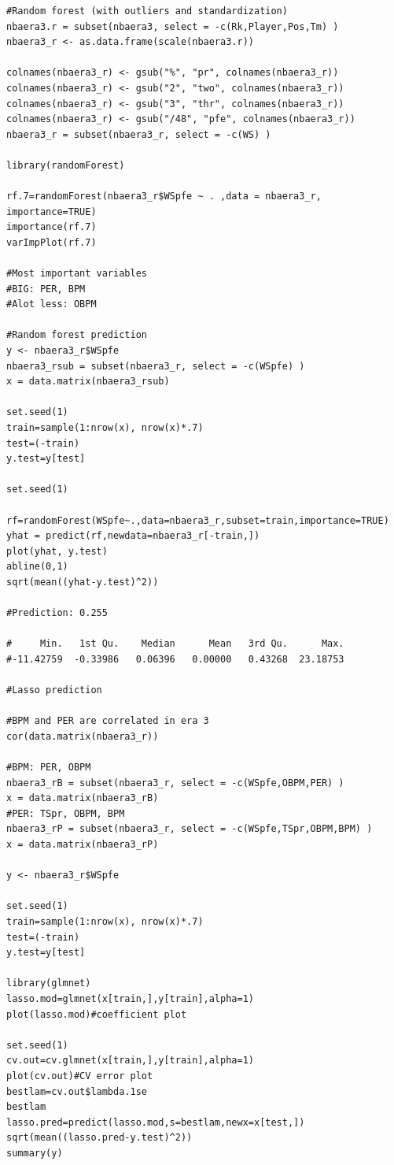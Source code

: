 \documentclass[11pt,letterpaper]{amsart}
\begin{document}
\begin{lstlisting}[breaklines]
#Random forest (with outliers and standardization)
nbaera3.r = subset(nbaera3, select = -c(Rk,Player,Pos,Tm) )
nbaera3_r <- as.data.frame(scale(nbaera3.r))

colnames(nbaera3_r) <- gsub("%", "pr", colnames(nbaera3_r))
colnames(nbaera3_r) <- gsub("2", "two", colnames(nbaera3_r))
colnames(nbaera3_r) <- gsub("3", "thr", colnames(nbaera3_r))
colnames(nbaera3_r) <- gsub("/48", "pfe", colnames(nbaera3_r))
nbaera3_r = subset(nbaera3_r, select = -c(WS) )

library(randomForest)

rf.7=randomForest(nbaera3_r$WSpfe ~ . ,data = nbaera3_r, importance=TRUE)
importance(rf.7)
varImpPlot(rf.7)

#Most important variables 
#BIG: PER, BPM 
#Alot less: OBPM

#Random forest prediction
y <- nbaera3_r$WSpfe
nbaera3_rsub = subset(nbaera3_r, select = -c(WSpfe) )
x = data.matrix(nbaera3_rsub)

set.seed(1)
train=sample(1:nrow(x), nrow(x)*.7)
test=(-train)
y.test=y[test]

set.seed(1)

rf=randomForest(WSpfe~.,data=nbaera3_r,subset=train,importance=TRUE)
yhat = predict(rf,newdata=nbaera3_r[-train,])
plot(yhat, y.test)
abline(0,1)
sqrt(mean((yhat-y.test)^2))

#Prediction: 0.255

#     Min.   1st Qu.    Median      Mean   3rd Qu.      Max. 
#-11.42759  -0.33986   0.06396   0.00000   0.43268  23.18753 

#Lasso prediction

#BPM and PER are correlated in era 3
cor(data.matrix(nbaera3_r))

#BPM: PER, OBPM
nbaera3_rB = subset(nbaera3_r, select = -c(WSpfe,OBPM,PER) )
x = data.matrix(nbaera3_rB)
#PER: TSpr, OBPM, BPM
nbaera3_rP = subset(nbaera3_r, select = -c(WSpfe,TSpr,OBPM,BPM) )
x = data.matrix(nbaera3_rP)

y <- nbaera3_r$WSpfe

set.seed(1)
train=sample(1:nrow(x), nrow(x)*.7)
test=(-train)
y.test=y[test]

library(glmnet)
lasso.mod=glmnet(x[train,],y[train],alpha=1)
plot(lasso.mod)#coefficient plot

set.seed(1)
cv.out=cv.glmnet(x[train,],y[train],alpha=1)
plot(cv.out)#CV error plot
bestlam=cv.out$lambda.1se
bestlam
lasso.pred=predict(lasso.mod,s=bestlam,newx=x[test,])
sqrt(mean((lasso.pred-y.test)^2))
summary(y)


\end{lstlisting}
\end{document}
